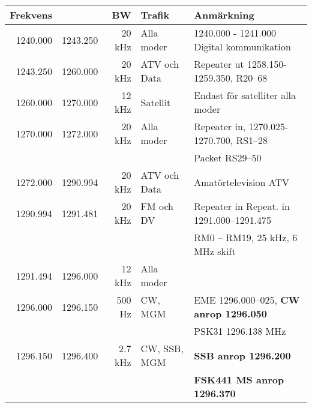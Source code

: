 \begin{tabular}{rrrll}
	\textbf{Frekvens}         &               & \textbf{BW} & \textbf{Trafik} & \textbf{Anmärkning}                                          \\ \hline
	         1240.000         & 1243.250      & 20 kHz      & Alla moder      & 1240.000 - 1241.000 Digital kommunikation                    \\ \hline
	         1243.250         & 1260.000      & 20 kHz      & ATV och Data    & Repeater ut 1258.150-1259.350, R20--68                       \\ \hline
	         1260.000         & 1270.000      & 12 kHz      & Satellit        & Endast för satelliter alla moder                             \\ \hline
	         1270.000         & 1272.000      & 20 kHz      & Alla moder      & Repeater in, 1270.025-1270.700, RS1--28                      \\
                                  &               &             &                 & Packet RS29--50                                              \\ \hline
	         1272.000         & 1290.994      & 20 kHz      & ATV och Data    & Amatörtelevision ATV                                         \\ \hline
	         1290.994         & 1291.481      & 20 kHz      & FM och DV       & Repeater in Repeat. in 1291.000--1291.475                    \\
                                  &               &             &                 & RM0 – RM19, 25 kHz, 6 MHz skift                              \\ \hline
	         1291.494         & 1296.000      & 12 kHz      & Alla moder      &                                                              \\ \hline
	         1296.000         & 1296.150      & 500 Hz      & CW,  MGM        & EME 1296.000--025, \textbf{CW anrop 1296.050}                \\
                                  &               &             &                 & PSK31 1296.138 MHz                                           \\ \hline
	         1296.150         & 1296.400      & 2.7 kHz     & CW, SSB, MGM    & \textbf{SSB anrop 1296.200}                                  \\
                                  &               &             &                 & \textbf{FSK441 MS anrop 1296.370}                            \\ \hline

\end{tabular}
